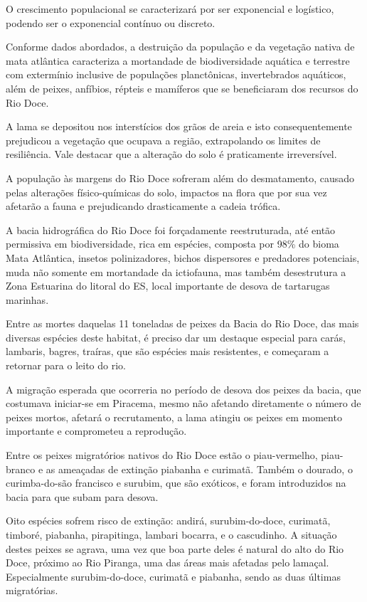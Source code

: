 \documentclass[
article,			%
11pt,				%
oneside,			%
a4paper,			%
english,			%
brazil,				%
sumario=tradicional
]{abntex2}
\begin{document}
	O crescimento populacional se caracterizará por ser exponencial e logístico, podendo ser o exponencial contínuo ou discreto.
	
	Conforme dados abordados, a destruição da população e da vegetação nativa de mata atlântica caracteriza a mortandade de biodiversidade aquática e terrestre com extermínio inclusive de populações planctônicas, invertebrados aquáticos, além de peixes, anfíbios, répteis e mamíferos que se beneficiaram dos recursos do Rio Doce.
	
	A lama se depositou nos interstícios dos grãos de areia e isto consequentemente prejudicou a vegetação que ocupava a região, extrapolando os limites de resiliência. Vale destacar que a alteração do solo é praticamente irreversível.
	
	A população às margens do Rio Doce sofreram além do desmatamento, causado pelas alterações físico-químicas do solo, impactos na flora que por sua vez afetarão a fauna e prejudicando drasticamente a cadeia trófica.
	
	A bacia hidrográfica do Rio Doce foi forçadamente reestruturada, até então permissiva em biodiversidade, rica em espécies, composta por 98\% do bioma Mata Atlântica, insetos polinizadores, bichos dispersores e predadores potenciais, muda não somente em mortandade da ictiofauna, mas também desestrutura a Zona Estuarina do litoral do ES, local importante de desova de tartarugas marinhas.
	
	Entre as mortes daquelas 11 toneladas de peixes da Bacia do Rio Doce, das mais diversas espécies deste habitat, é preciso dar um destaque especial para carás, lambaris, bagres, traíras, que são espécies mais resistentes, e começaram a retornar para o leito do rio.
	
	A migração esperada que ocorreria no período de desova dos peixes da bacia, que costumava iniciar-se em Piracema, mesmo não afetando diretamente o número de peixes mortos, afetará o recrutamento, a lama atingiu os peixes em momento importante e comprometeu a reprodução.
	
	Entre os peixes migratórios nativos do Rio Doce estão o piau-vermelho, piau-branco e as ameaçadas de extinção piabanha e curimatã. Também o dourado, o curimba-do-são francisco e surubim, que são exóticos, e foram introduzidos na bacia para que subam para desova.
	
	Oito espécies sofrem risco de extinção: andirá, surubim-do-doce, curimatã, timboré, piabanha, pirapitinga, lambari bocarra, e o cascudinho. A situação destes peixes se agrava, uma vez que boa parte deles é natural do alto do Rio Doce, próximo ao Rio Piranga, uma das áreas mais afetadas pelo lamaçal. Especialmente surubim-do-doce, curimatã e piabanha, sendo as duas últimas migratórias. 
	
\end{document}
